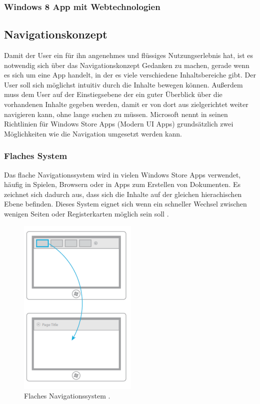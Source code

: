 \documentclass[12pt,a4paper]{scrartcl}
\begin{document}
\subsubsection{Windows 8 App mit Webtechnologien}
\label{subsubsec:webwin8}

\subsection{Navigationskonzept}
\label{subsec:navikonzept}
Damit der User ein für ihn angenehmes und flüssiges Nutzungserlebnis hat, ist es notwendig sich über das Navigationskonzept Gedanken zu machen, gerade wenn es sich um eine App handelt, in der es viele verschiedene Inhaltsbereiche gibt. Der User soll sich möglichst intuitiv durch die Inhalte bewegen können. Außerdem muss dem User auf der Einstiegsebene der ein guter Überblick über die vorhandenen Inhalte gegeben werden, damit er von dort aus zielgerichtet weiter navigieren kann, ohne lange suchen zu müssen. Microsoft nennt in seinen Richtlinien für Windows Store Apps (Modern UI Apps) grundsätzlich zwei Möglichkeiten wie die Navigation umgesetzt werden kann.

\subsubsection{Flaches System}
\label{subsubsec:flachessystem}
Das flache Navigationssystem wird in vielen Windows Store Apps verwendet, häufig in Spielen, Browsern oder in Apps zum Erstellen von Dokumenten. Es zeichnet sich dadurch aus, dass sich die Inhalte auf der gleichen hierachischen Ebene befinden. Dieses System eignet sich wenn ein schneller Wechsel zwischen wenigen Seiten oder Registerkarten möglich sein soll \citep{MicrosoftNavidesign2013}.

\begin{figure}[h]	
	\centering
	\includegraphics[scale=1]{Bilder/Abbildungen/ms_navigation_flach.png} 
	\caption{Flaches Navigationssystem \protect\citep{MicrosoftNavidesign2013}.}
	\label{fig:naviflach}
\end{figure}
\end{document}
